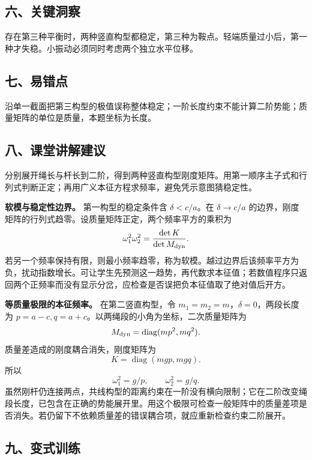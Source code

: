 \documentclass[12pt,a4paper,UTF8]{ctexart}
\begin{document}
\subsection{六、关键洞察}\label{ux516dux5173ux952eux6d1eux5bdf-3}

存在第三种平衡时，两种竖直构型都稳定，第三种为鞍点。轻端质量过小后，第一种才失稳。小振动必须同时考虑两个独立水平位移。

\subsection{七、易错点}\label{ux4e03ux6613ux9519ux70b9-3}

沿单一截面把第三构型的极值误称整体稳定；一阶长度约束不能计算二阶势能；质量矩阵的单位是质量，本题坐标为长度。

\subsection{八、课堂讲解建议}\label{ux516bux8bfeux5802ux8bb2ux89e3ux5efaux8bae-3}

分别展开绳长与杆长到二阶，得到两种竖直构型刚度矩阵。用第一顺序主子式和行列式判断正定；再用广义本征方程求频率，避免凭示意图猜稳定性。

\textbf{软模与稳定性边界。} 第一构型的稳定条件含 \(\delta<c/a\)。在
\(\delta\to c/a\)
的边界，刚度矩阵的行列式趋零。设质量矩阵正定，两个频率平方的乘积为 \[
\omega_1^2\omega_2^2=\frac{\det K}{\det M_{\rm dyn}}.
\]
若另一个频率保持有限，则最小频率趋零，称为软模。越过边界后该频率平方为负，扰动指数增长。可让学生先预测这一趋势，再代数求本征值；若数值程序只返回两个正频率而没有显示分岔，应检查是否误把负本征值取了绝对值后开方。

\textbf{等质量极限的本征频率。} 在第二竖直构型，令
\(m_1=m_2=m\)，\(\delta=0\)，两段长度为
\(p=a-c,q=a+c\)。以两绳段的小角为坐标，二次质量矩阵为 \[
M_{\rm dyn}=\operatorname{diag}(mp^2,mq^2).
\] 质量差造成的刚度耦合消失，刚度矩阵为 \[
K=\operatorname{diag}(mgp,mgq).
\] 所以 \[
\boxed{\omega_1^2=g/p,\qquad \omega_2^2=g/q}.
\]
虽然刚杆仍连接两点，共线构型的距离约束在一阶没有横向限制；它在二阶改变绳段长度，已包含在正确的势能展开里。用这个极限可检查一般矩阵中的质量差项是否消失。若仍留下不依赖质量差的错误耦合项，就应重新检查约束二阶展开。

\subsection{九、变式训练}\label{ux4e5dux53d8ux5f0fux8badux7ec3-3}
\end{document}
